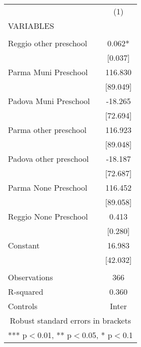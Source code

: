\begin{tabular}{lc} \hline
 & (1) \\
VARIABLES &  \\ \hline
 &  \\
Reggio other preschool & 0.062* \\
 & [0.037] \\
Parma Muni Preschool & 116.830 \\
 & [89.049] \\
Padova Muni Preschool & -18.265 \\
 & [72.694] \\
Parma other preschool & 116.923 \\
 & [89.048] \\
Padova other preschool & -18.187 \\
 & [72.687] \\
Parma None Preschool & 116.452 \\
 & [89.058] \\
Reggio None Preschool & 0.413 \\
 & [0.280] \\
Constant & 16.983 \\
 & [42.032] \\
 &  \\
Observations & 366 \\
R-squared & 0.360 \\
 Controls & Inter \\ \hline
\multicolumn{2}{c}{ Robust standard errors in brackets} \\
\multicolumn{2}{c}{ *** p$<$0.01, ** p$<$0.05, * p$<$0.1} \\
\end{tabular}
